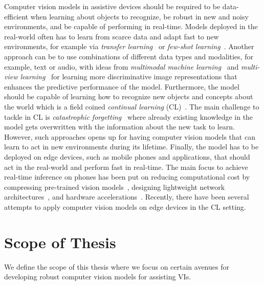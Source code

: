 Computer vision models in assistive devices should be required to be data-efficient when learning about objects to recognize, be robust in new and noisy environments, and be capable of performing in real-time. Models deployed in the real-world often has to learn from scarce data and adapt fast to new environments, for example via \textit{transfer learning}~\cite{sharif2014cnn, zhuang2020comprehensive} or \textit{few-shot learning}~\cite{wang2020generalizing}. Another approach can be to use combinations of different data types and modalities, for example, text or audio, with ideas from \textit{multimodal machine learning}~\cite{baltruvsaitis2018multimodal} and \textit{multi-view learning}~\cite{xu2013survey} for learning more discriminative image representations that enhances the predictive performance of the model. Furthermore, the model should be capable of learning how to recognize new objects and concepts about the world which is a field coined \textit{continual learning} (CL)~\cite{delange2021continual, parisi2019continual}. The main challenge to tackle in CL is \textit{catastrophic forgetting}~\cite{mccloskey1989catastrophic} where already existing knowledge in the model gets overwritten with the information about the new task to learn. However, such approaches opens up for having computer vision models that can learn to act in new environments during its lifetime. Finally, the model has to be deployed on edge devices, such as mobile phones and applications, that should act in the real-world and perform fast in real-time. The main focus to achieve real-time inference on phones has been put on reducing computational cost by compressing pre-trained vision models~\cite{han2015deep}, designing lightweight network architectures~\cite{howard2017mobilenets, zhang2018shufflenet}, and hardware accelerations~\cite{huynh2017deepmon}. Recently, there have been several attempts to apply computer vision models on edge devices in the CL setting\cite{ li2019rilod, pellegrini2019latent}.



\section{Scope of Thesis}

We define the scope of this thesis where we focus on certain avenues for developing robust computer vision models for assisting VIs. 



